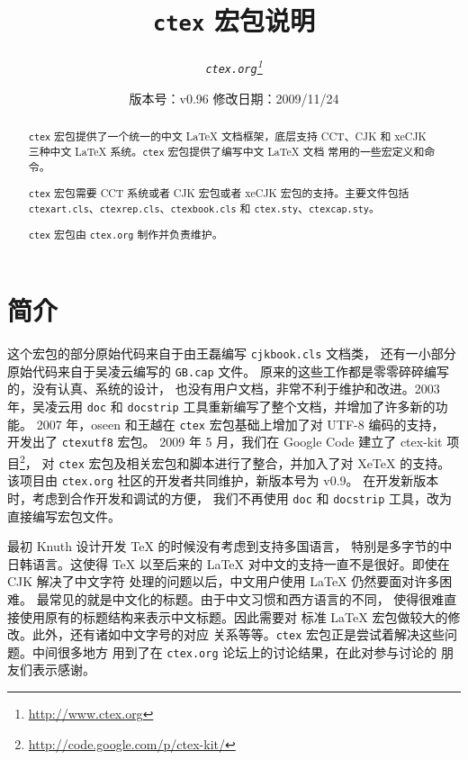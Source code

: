 \documentclass{ltxdoc}
\newcommand{\ctex}{\texttt{ctex}}
\newcommand{\ctexorg}{\texttt{ctex.org}}
\begin{document}
\title{\bf \ctex{} 宏包说明}
\author{\it \ctexorg\thanks{\url{http://www.ctex.org}}}
\date{\small 版本号：v0.96 \ccwd 修改日期：2009/11/24}
\maketitle


\begin{abstract}
\ctex{} 宏包提供了一个统一的中文 \LaTeX{} 文档框架，底层支持 CCT、CJK 和
 xeCJK 三种中文 \LaTeX{} 系统。\ctex{} 宏包提供了编写中文 \LaTeX{} 文档
常用的一些宏定义和命令。

\ctex{} 宏包需要 CCT 系统或者 CJK 宏包或者 xeCJK 宏包的支持。主要文件包括
 \texttt{ctexart.cls}、\texttt{ctexrep.cls}、\texttt{ctexbook.cls} 和
 \texttt{ctex.sty}、\texttt{ctexcap.sty}。

\ctex{} 宏包由 \ctexorg{} 制作并负责维护。
\end{abstract}

\tableofcontents

\section{简介}

这个宏包的部分原始代码来自于由王磊编写 \texttt{cjkbook.cls} 文档类，
还有一小部分原始代码来自于吴凌云编写的 \texttt{GB.cap} 文件。
原来的这些工作都是零零碎碎编写的，没有认真、系统的设计，
也没有用户文档，非常不利于维护和改进。2003 年，吴凌云用 \texttt{doc}
和 \texttt{docstrip} 工具重新编写了整个文档，并增加了许多新的功能。
2007 年，oseen 和王越在 \ctex{} 宏包基础上增加了对 UTF-8 编码的支持，
开发出了 \texttt{ctexutf8} 宏包。
2009 年 5 月，我们在 Google Code 建立了 ctex-kit 项目\footnote{\url{http://code.google.com/p/ctex-kit/}}，
对 \ctex{} 宏包及相关宏包和脚本进行了整合，并加入了对 Xe\TeX{} 的支持。
该项目由 \ctexorg{} 社区的开发者共同维护，新版本号为 v0.9。
在开发新版本时，考虑到合作开发和调试的方便，
我们不再使用 \texttt{doc} 和 \texttt{docstrip} 工具，改为直接编写宏包文件。

最初 Knuth 设计开发 \TeX{} 的时候没有考虑到支持多国语言，
特别是多字节的中日韩语言。这使得 \TeX{} 以至后来的
\LaTeX{} 对中文的支持一直不是很好。即使在 CJK 解决了中文字符
处理的问题以后，中文用户使用 \LaTeX{} 仍然要面对许多困难。
最常见的就是中文化的标题。由于中文习惯和西方语言的不同，
使得很难直接使用原有的标题结构来表示中文标题。因此需要对
标准 \LaTeX{} 宏包做较大的修改。此外，还有诸如中文字号的对应
关系等等。\ctex{} 宏包正是尝试着解决这些问题。中间很多地方
用到了在 \ctexorg{} 论坛上的讨论结果，在此对参与讨论的
朋友们表示感谢。
\end{document}
